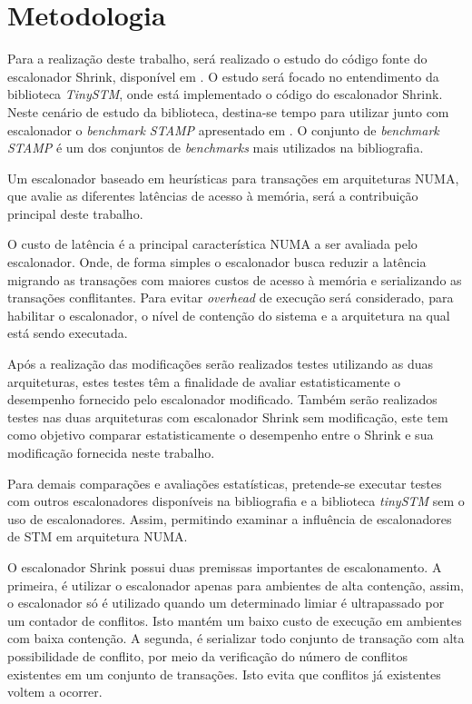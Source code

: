 \documentclass[diss-proposta,nocipinfo]{texufpel}
\begin{document}
\chapter{Metodologia}

Para a realização deste trabalho, será realizado o estudo do código fonte do escalonador Shrink, disponível em \cite{shrink09}. O estudo será focado no entendimento da biblioteca \emph{TinySTM}, onde está implementado o código do escalonador Shrink. Neste cenário de estudo da biblioteca, destina-se tempo para utilizar junto com escalonador o \emph{benchmark STAMP} apresentado em \cite{STAMP}. O conjunto de \emph{benchmark STAMP} é um dos conjuntos de \emph{benchmarks} mais utilizados na bibliografia.

Um escalonador baseado em heurísticas para transações em arquiteturas NUMA, que avalie as diferentes latências de acesso à memória, será a contribuição principal deste trabalho.

O custo de latência é a principal característica NUMA a ser avaliada pelo escalonador. Onde, de forma simples o escalonador busca reduzir a latência migrando as transações com maiores custos de acesso à memória e serializando as transações conflitantes. Para evitar \emph{overhead} de execução será considerado, para habilitar o escalonador, o nível de contenção do sistema e a arquitetura na qual está sendo executada.

Após a realização das modificações serão realizados testes utilizando as duas arquiteturas, estes testes têm a finalidade de avaliar estatisticamente o desempenho fornecido pelo escalonador modificado. Também serão realizados testes nas duas arquiteturas com escalonador Shrink sem modificação, este tem como objetivo comparar estatisticamente o desempenho entre o Shrink e sua modificação fornecida neste trabalho.

Para demais comparações e avaliações estatísticas, pretende-se executar testes com outros escalonadores disponíveis na bibliografia e a biblioteca \emph{tinySTM} sem o uso de escalonadores. Assim, permitindo examinar a influência de escalonadores de STM em arquitetura NUMA.

O escalonador Shrink possui duas premissas importantes de escalonamento. A primeira, é utilizar o escalonador apenas para ambientes de alta contenção, assim, o escalonador só é utilizado quando um determinado limiar é ultrapassado por um contador de conflitos. Isto mantém um baixo custo de execução em ambientes com baixa contenção. A segunda, é serializar todo conjunto de transação com alta possibilidade de conflito, por meio da verificação do número de conflitos existentes em um conjunto de transações. Isto evita que conflitos já existentes voltem a ocorrer.
\end{document}

